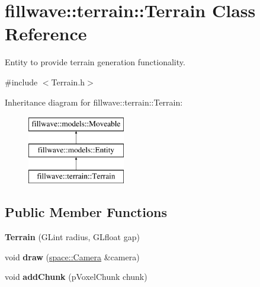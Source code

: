\hypertarget{classfillwave_1_1terrain_1_1Terrain}{}\section{fillwave\+:\+:terrain\+:\+:Terrain Class Reference}
\label{classfillwave_1_1terrain_1_1Terrain}


Entity to provide terrain generation functionality.  




{\ttfamily \#include $<$Terrain.\+h$>$}

Inheritance diagram for fillwave\+:\+:terrain\+:\+:Terrain\+:\begin{figure}[H]
\begin{center}
\leavevmode
\includegraphics[height=3.000000cm]{classfillwave_1_1terrain_1_1Terrain}
\end{center}
\end{figure}
\subsection*{Public Member Functions}
\begin{DoxyCompactItemize}
\item 
\hypertarget{classfillwave_1_1terrain_1_1Terrain_a2348216228e478b3286440330fc010e7}{}{\bfseries Terrain} (G\+Lint radius, G\+Lfloat gap)\label{classfillwave_1_1terrain_1_1Terrain_a2348216228e478b3286440330fc010e7}

\item 
\hypertarget{classfillwave_1_1terrain_1_1Terrain_a1d7ecbeeec67ff04451889d705477e08}{}void {\bfseries draw} (\hyperlink{classfillwave_1_1space_1_1Camera}{space\+::\+Camera} \&camera)\label{classfillwave_1_1terrain_1_1Terrain_a1d7ecbeeec67ff04451889d705477e08}

\item 
\hypertarget{classfillwave_1_1terrain_1_1Terrain_a38817ab8e8843f775d891b4ce2929b66}{}void {\bfseries add\+Chunk} (p\+Voxel\+Chunk chunk)\label{classfillwave_1_1terrain_1_1Terrain_a38817ab8e8843f775d891b4ce2929b66}

\end{DoxyCompactItemize}
